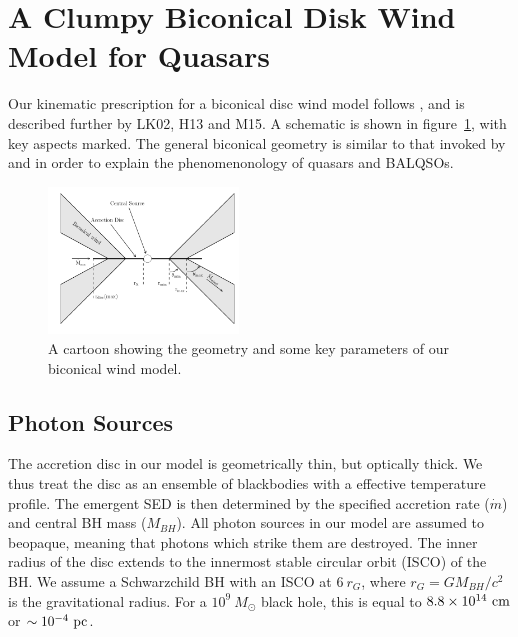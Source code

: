 \documentclass[preprint, a4paper, 11pt]{aastex}
\begin{document}




\section{A Clumpy Biconical Disk Wind Model for Quasars}


Our kinematic prescription for a biconical disc wind model
follows \cite{SV93}, and is described further by
LK02, H13 and M15. A schematic is shown in figure~\ref{fig:cartoon},
with key aspects marked. The general biconical
geometry is similar to that invoked by \cite{MCGV95} and 
\cite{elvis2000} in order to explain the phenomenonology
of quasars and BALQSOs.


\begin{figure} 
\centering
\includegraphics[width=0.45\textwidth]{figures/fig2_cartoon.png}
\caption
{
A cartoon showing the geometry and some key parameters of
our biconical wind model.
}
\label{fig:cartoon}
\end{figure} 





\subsection{Photon Sources}


The accretion disc in our model is geometrically thin, but optically thick.
We thus treat the disc as an ensemble of blackbodies with a 
\cite{shakurasunyaev1973} effective temperature profile. 
The emergent SED is then determined by the specified accretion rate ($\dot{m}$)
and central BH mass ($M_{BH}$).
All photon sources in our model are assumed to beopaque, meaning
that photons which strike them are destroyed.
The inner radius of the disc extends to the innermost 
stable circular orbit (ISCO) of the BH. 
We assume a Schwarzchild BH with an ISCO at $6~r_G$, where 
$r_G = GM_{BH}/c^2$ is the gravitational radius.
For a $10^9~M_\odot$ black hole, this is equal to $8.8\times10^{14}~{\rm cm}$ 
or $\sim10^{-4}~{\rm pc}$.  
\end{document}
